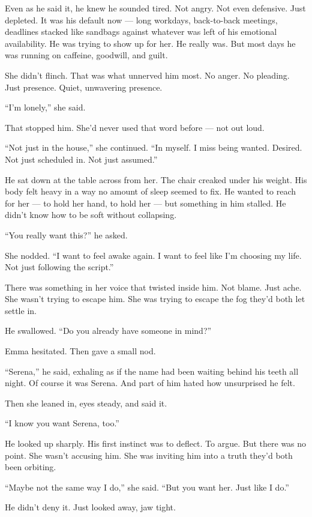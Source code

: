 Even as he said it, he knew he sounded tired. Not angry. Not even defensive. Just depleted. It was his default now — long workdays, back-to-back meetings, deadlines stacked like sandbags against whatever was left of his emotional availability. He was trying to show up for her. He really was. But most days he was running on caffeine, goodwill, and guilt.

She didn’t flinch. That was what unnerved him most. No anger. No pleading. Just presence. Quiet, unwavering presence.

“I’m lonely,” she said.

That stopped him. She’d never used that word before — not out loud.

“Not just in the house,” she continued. “In myself. I miss being wanted. Desired. Not just scheduled in. Not just assumed.”

He sat down at the table across from her. The chair creaked under his weight. His body felt heavy in a way no amount of sleep seemed to fix. He wanted to reach for her — to hold her hand, to hold her — but something in him stalled. He didn’t know how to be soft without collapsing.

“You really want this?” he asked.

She nodded. “I want to feel awake again. I want to feel like I’m choosing my life. Not just following the script.”

There was something in her voice that twisted inside him. Not blame. Just ache. She wasn’t trying to escape him. She was trying to escape the fog they’d both let settle in.

He swallowed. “Do you already have someone in mind?”

Emma hesitated. Then gave a small nod.

“Serena,” he said, exhaling as if the name had been waiting behind his teeth all night. Of course it was Serena. And part of him hated how unsurprised he felt.

Then she leaned in, eyes steady, and said it.

“I know you want Serena, too.”

He looked up sharply. His first instinct was to deflect. To argue. But there was no point. She wasn’t accusing him. She was inviting him into a truth they’d both been orbiting.

“Maybe not the same way I do,” she said. “But you want her. Just like I do.”

He didn’t deny it. Just looked away, jaw tight.

